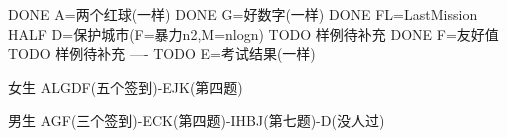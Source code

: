 
DONE A=两个红球(一样)
DONE G=好数字(一样)
DONE FL=LastMission
HALF D=保护城市(F=暴力n2,M=nlogn) TODO 样例待补充
DONE F=友好值                     TODO 样例待补充
----
TODO E=考试结果(一样)

女生
ALGDF(五个签到)-EJK(第四题)

男生
AGF(三个签到)-ECK(第四题)-IHBJ(第七题)-D(没人过)

